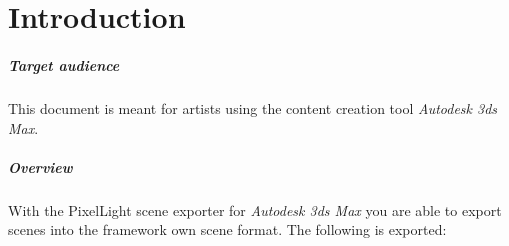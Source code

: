 \chapter{Introduction}


\paragraph{Target audience}
This document is meant for artists using the content creation tool \emph{Autodesk 3ds Max}.


\paragraph{Overview}
With the PixelLight scene exporter for \emph{Autodesk 3ds Max} you are able to export scenes into the framework own scene format. The following is exported:
